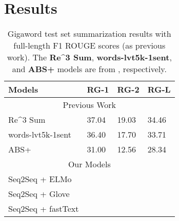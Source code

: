\section{Results}
\label{sec: result}

\begin{table}[ht]
\centering
\caption{Gigaword test set summarization results with full-length F1 ROUGE scores (as previous work). The \textbf{Re\^{}3 Sum}, \textbf{words-lvt5k-1sent}, and \textbf{ABS+} models are from \cite{cao2018retrieve, nallapati2016abstractive, rush2015neural}, respectively.}
\begin{tabular}{|l|l|l|l|} 
\hline
Models                                        & \multicolumn{1}{c|}{RG-1} & \multicolumn{1}{c|}{RG-2} & \multicolumn{1}{c|}{RG-L}  \\ 
\hline
\multicolumn{4}{|c|}{Previous Work}                                                                                                         \\ 
\hline
Re\^{}3 Sum         & 37.04                        & 19.03                        & 34.46                         \\ 
\hline
words-lvt5k-1sent & 36.40                        & 17.70                        & 33.71                         \\ 
\hline
ABS+               & 31.00                        & 12.56                        & 28.34                         \\ 
\hline
\multicolumn{4}{|c|}{Our Models}                                                                                                            \\ 
\hline
Seq2Seq + ELMo                                &                              &                              &                               \\ 
\hline
Seq2Seq + Glove                               &                              &                              &                               \\ 
\hline
Seq2Seq + fastText                            &                              &                              &                               \\
\hline
\end{tabular}
\label{tab: compare_embed}
\end{table}


